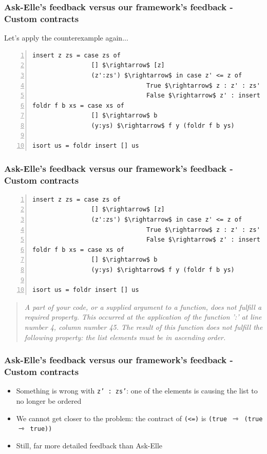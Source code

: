 \documentclass[]{beamer}
\begin{document}
\begin{frame}[fragile]
\frametitle{Ask-Elle's feedback versus our framework's feedback - Custom contracts}

Let's apply the counterexample again...

\begin{lstlisting}[mathescape,numbers=left]
insert z zs = case zs of
                [] $\rightarrow$ [z]
                (z':zs') $\rightarrow$ in case z' <= z of
                               True $\rightarrow$ z : z' : zs'
                               False $\rightarrow$ z' : insert z zs'
foldr f b xs = case xs of
                [] $\rightarrow$ b
                (y:ys) $\rightarrow$ f y (foldr f b ys)
                
isort us = foldr insert [] us
\end{lstlisting}

\end{frame}

\begin{frame}[fragile]
\frametitle{Ask-Elle's feedback versus our framework's feedback - Custom contracts}

\begin{lstlisting}[mathescape,numbers=left]
insert z zs = case zs of
                [] $\rightarrow$ [z]
                (z':zs') $\rightarrow$ in case z' <= z of
                               True $\rightarrow$ z : z' : zs'
                               False $\rightarrow$ z' : insert z zs'
foldr f b xs = case xs of
                [] $\rightarrow$ b
                (y:ys) $\rightarrow$ f y (foldr f b ys)
                
isort us = foldr insert [] us
\end{lstlisting}

\begin{quote}
\textit{A part of your code, or a supplied argument to a function, does not fulfill a required property. This occurred at the application of the function ':' at line number 4, column number 45. The result of this function does not fulfill the following property: the list elements must be in ascending order.}
\end{quote}

\end{frame}

\begin{frame}[fragile]
\frametitle{Ask-Elle's feedback versus our framework's feedback - Custom contracts}

\begin{itemize}
	\item Something is wrong with \texttt{z' : zs'}: one of the elements is causing the list to no longer be ordered
	\item We cannot get closer to the problem: the contract of \texttt{(<=)} is \texttt{(true $\rightarrowtriangle$ (true $\rightarrowtriangle$ true))}
	\item Still, far more detailed feedback than Ask-Elle
\end{itemize}

\end{frame}
\end{document}
